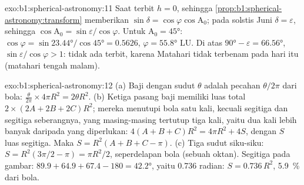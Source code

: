 \begin{solution}{exo:b1:spherical-astronomy:11}
Saat terbit $h = 0$, sehingga \cref{prop:b1:spherical-astronomy:transform} memberikan
$\sin\delta = \cos\varphi\cos\mathrm{A}_0$; pada solstis Juni
$\delta = \varepsilon$, sehingga $\cos\mathrm{A}_0 = \sin\varepsilon/\cos\varphi$.
Untuk $\mathrm{A}_0 = \ang{45}$: $\cos\varphi = \sin\ang{23.44}/\cos\ang{45} =
0.5626$, $\varphi = \ang{55.8}$ LU. Di atas $\ang{90} - \varepsilon =
\ang{66.56}$, $\sin\varepsilon/\cos\varphi > 1$: tidak ada  terbit, karena
Matahari tidak terbenam pada hari itu (matahari tengah malam).
\end{solution}

\begin{solution}{exo:b1:spherical-astronomy:12}
(a) Baji dengan sudut $\theta$ adalah pecahan $\theta/2\pi$ dari bola:
$\frac{\theta}{2\pi}\times4\pi R^2 = 2\theta R^2$. (b) Ketiga pasang baji
memiliki luas total $2\times(2A + 2B + 2C)R^2$; mereka menutupi bola satu kali,
kecuali segitiga dan segitiga seberangnya, yang masing-masing tertutup tiga kali, yaitu
dua kali lebih banyak daripada yang diperlukan: $4(A + B + C)R^2 = 4\pi R^2 + 4S$, dengan $S$ luas
segitiga. Maka $S = R^2(A + B + C - \pi)$. (c) Tiga sudut siku-siku:
$S = R^2(3\pi/2 - \pi) = \pi R^2/2$, seperdelapan bola (sebuah oktan).
Segitiga pada gambar: $89.9 + 64.9 + 67.4 - 180 = \ang{42.2}$, yaitu
\num{0.736} radian: $S = 0.736\,R^2$, \qty{5.9}{\percent} dari bola.
\end{solution}

